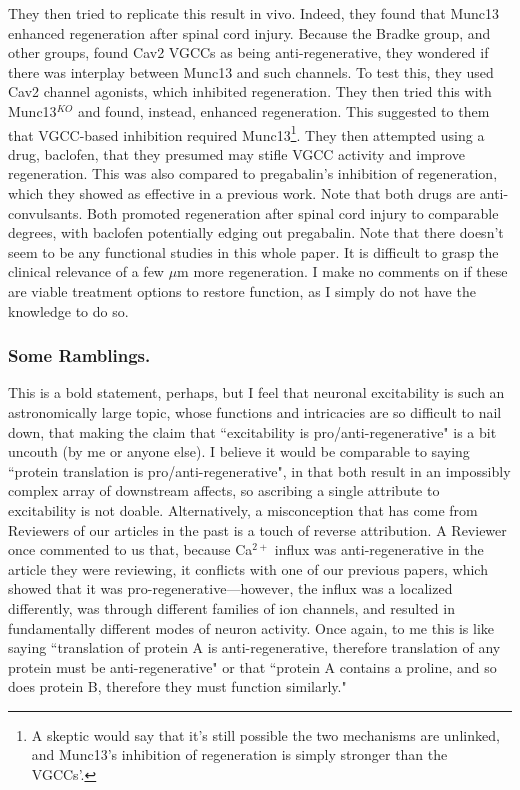They then tried to replicate this result in vivo. Indeed, they found that Munc13 enhanced regeneration after spinal cord injury. Because the Bradke group, and other groups, found Cav2 VGCCs as being anti-regenerative, they wondered if there was interplay between Munc13 and such channels. To test this, they used Cav2 channel agonists, which inhibited regeneration. They then tried this with Munc13$^{KO}$ and found, instead, enhanced regeneration. This suggested to them that VGCC-based inhibition required Munc13\footnote{A skeptic would say that it's still possible the two mechanisms are unlinked, and Munc13's inhibition of regeneration is simply stronger than the VGCCs'.}. They then attempted using a drug, baclofen, that they presumed may stifle VGCC activity and improve regeneration. This was also compared to pregabalin's inhibition of regeneration, which they showed as effective in a previous work. Note that both drugs are anti-convulsants. Both promoted regeneration after spinal cord injury to comparable degrees, with baclofen potentially edging out pregabalin. Note that there doesn't seem to be any functional studies in this whole paper. It is difficult to grasp the clinical relevance of a few $\mu$m more regeneration. I make no comments on if these are viable treatment options to restore function, as I simply do not have the knowledge to do so.\newline


\subsubsection{Some Ramblings.}

This is a bold statement, perhaps, but I feel that neuronal excitability is such an astronomically large topic, whose functions and intricacies are so difficult to nail down, that making the claim that ``excitability is pro/anti-regenerative" is a bit uncouth (by me or anyone else). I believe it would be comparable to saying ``protein translation is pro/anti-regenerative", in that both result in an impossibly complex array of downstream affects, so ascribing a single attribute to excitability is not doable. Alternatively, a misconception that has come from Reviewers of our articles in the past is a touch of reverse attribution. A Reviewer once commented to us that, because Ca$^{2+}$ influx was anti-regenerative in the article they were reviewing, it conflicts with one of our previous papers, which showed that it was pro-regenerative---however, the influx was a localized differently, was through different families of ion channels, and resulted in fundamentally different modes of neuron activity. Once again, to me this is like saying ``translation of protein A is anti-regenerative, therefore translation of any protein must be anti-regenerative" or that ``protein A contains a proline, and so does protein B, therefore they must function similarly."\newline

